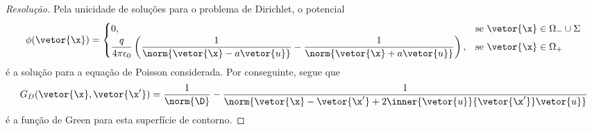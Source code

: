\begin{proof}[Resolução]
    Pela unicidade de soluções para o problema de Dirichlet, o potencial
    \begin{equation*}
        \phi(\vetor{\x}) = \begin{cases}
            0,&\text{se }\vetor{\x} \in \Omega_- \cup \Sigma\\
            \dfrac{q}{4\pi \epsilon_0} \left(\dfrac{1}{\norm{\vetor{\x} - a \vetor{u}}} - \dfrac{1}{\norm{\vetor{\x} + a\vetor{u}}}\right),&\text{se }\vetor{\x} \in \Omega_+
        \end{cases}
    \end{equation*}
    é a solução para a equação de Poisson considerada. Por conseguinte, segue que
    \begin{equation*}
        G_D(\vetor{\x}, \vetor{\x'}) = \frac{1}{\norm{\D}} - \frac{1}{\norm{\vetor{\x} - \vetor{\x'} + 2\inner{\vetor{u}}{\vetor{\x'}}\vetor{u}}}
    \end{equation*}
    é a função de Green para esta superfície de contorno.
\end{proof}
